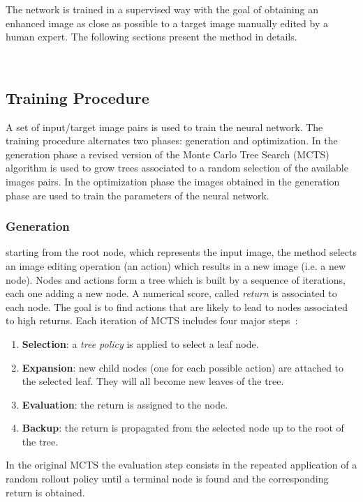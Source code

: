 \documentclass[3p,twocolumn]{elsarticle}
\begin{document}
The network is trained in a supervised way with     the goal of obtaining an enhanced image  as close as possible to a target image  manually edited by a human expert. 
The following sections present the method in details.

\


\subsection{Training Procedure}
\label{sec:MCTS}
A set of input/target image pairs is used to train the neural network.
The training procedure alternates two phases: generation and optimization.
In the generation phase a revised version of the Monte Carlo Tree Search (MCTS) algorithm is used to grow trees associated to a random selection of the available images pairs.
In the optimization phase the images obtained in the generation phase are used to train the parameters of the neural network.

\subsubsection{Generation}
starting from the root node, which represents the input image, the method selects an image editing operation (an action) which results in a new image (i.e. a new node). Nodes and actions form a tree which is built by a sequence of iterations, each one adding a new node.  A numerical score, called \emph{return} is associated to each node. The goal is to find actions that are likely to lead to nodes associated to high returns.
Each iteration of MCTS includes four major steps~\cite{browne2012survey}:
\begin{enumerate}
    \item \textbf{Selection}: a \textit{tree policy} is applied to select a leaf node. 
    \item \textbf{Expansion}: new child nodes (one for each possible action) are attached to the selected leaf.  They will all become new leaves of the tree.
    \item \textbf{Evaluation}: the return is assigned to the node.
    \item \textbf{Backup}: the return is propagated from the selected node up to the root of the tree.
\end{enumerate}
In the original MCTS the evaluation step consists in the repeated application of a random rollout policy until a terminal node is found and the corresponding return is obtained. 
\end{document}
